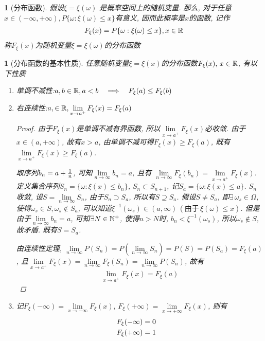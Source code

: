 \newtheorem{distribution_function}[theorem_root]{}
\begin{distribution_function}[分布函数]
假设\(\xi = \xi(\omega)\) 是概率空间\prbsp 上的随机变量. 那么, 对于任意\(x\in(-\infty, +\infty), P\{\omega:\xi(\omega)\le x\}\)有意义, 
因而此概率是\(x\)的函数, 记作
\begin{align}
F_{\xi}(x) = P\{\omega:\xi(\omega)\le x\}, x\in\Rs
\end{align}
称\(F_{\xi}(x)\)为随机变量\(\xi = \xi(\omega)\)的分布函数
\end{distribution_function}

\newtheorem{some_properties_of_disfunc}[theorem_root]{\remark}
\begin{some_properties_of_disfunc}[分布函数的基本性质]
任意随机变量\(\xi = \xi(x)\)的分布函数\(F_{\xi}(x),\,x\in\Rs\), 有以下性质
\begin{enumerate}
    \item 单调不减性:\quad \(a, b\in\Rs, a<b\quad\Longrightarrow\quad F_{\xi}(a)\le F_{\xi}(b)\)
    \item 右连续性:\quad \(a,\in\Rs, \lim\limits_{x\to a^+}F_{\xi}(x) = F_{\xi}(a)\)
    \begin{proof}
        由于\(F_{\xi}(x)\)是单调不减有界函数, 所以\(\lim\limits_{x\to a^+}F_{\xi}(x)\)必收敛.
        由于\(x\in (a, +\infty)\), 故有\(x>a\), 由单调不减可得\(F_{\xi}(x)\ge F_{\xi}(a)\),
        既有\(\lim\limits_{x\to a^+}F_{\xi}(x)\ge F_{\xi}(a)\). 

        取序列\(b_n = a + {1\over n}\), 可知\(\lim\limits_{n\to\infty}b_n = a\), 且有
        \(\lim\limits_{n\to\infty}F_{\xi}(b_n) = \lim\limits_{x\to a^+}F_{\xi}(x)\).
        定义集合序列\(S_n = \{\omega:\xi(x)\le b_n\}\), \(S_n\subset S_{n+1}\), 记\(S_a = \{\omega:\xi(x)\le a\}\).
        \(S_n\)收敛, 设\(S = \lim\limits_{n\to\infty}S_n\), 由于\(S_n\supset S_a\), 所以有\(S\supseteq S_a\).
        假设\(S\ne S_a\), 即\(\exists\,\omega_s\in\Omega\), 使得\(\omega_s\in S, \omega_s\notin S_a\), 可以知道\(\xi^{-1}(\omega_s)\in (a, \infty)\,(\text{由于}\,\xi(\omega)\le x)\).
        但是由于\(\lim\limits_{n\to\infty} b_n = a\), 可知\(\exists N\in\Ns^+\), 使得\(n>N\)时, \(b_n < \xi^{-1}(\omega_s)\), 所以\(\omega_s\notin S\), 故矛盾.
        既有\(S = S_a\).

        由连续性定理, \(\lim\limits_{n\to\infty}P(S_n) = P(\lim\limits_{n\to\infty}S_n) = P(S) = P(S_a) = F_{\xi}(a)\),
        且\(\lim\limits_{x\to a^+}F_{\xi}(x) = \lim\limits_{n\to\infty}F_{\xi}(S_n) = \lim\limits_{n\to\infty}P(S_n)\), 故有
        \begin{align}
            \lim\limits_{x\to a^+}F_{\xi}(x) = F_{\xi}(a)
        \end{align}
    \end{proof}
    \item 记\(F_{\xi}(-\infty) = \lim\limits_{x\to-\infty}F_{\xi}(x),\,F_{\xi}(+\infty) = \lim\limits_{x\to+\infty}F_{\xi}(x)\), 则有
    \begin{align}
        F_{\xi}(-\infty) &= 0\cr
        F_{\xi}(+\infty) &= 1
    \end{align}
\end{enumerate}
\end{some_properties_of_disfunc}

